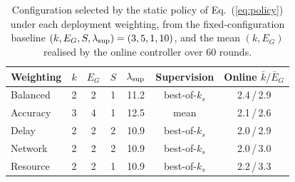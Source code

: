 \begin{table}[!t]\centering
\caption{Configuration selected by the static policy of Eq.~(\ref{eq:policy}) under each deployment weighting, from the fixed-configuration baseline $(k,E_G,S,\lambda_{\rm sup})=(3,5,1,10)$, and the mean $(k,E_G)$ realised by the online controller over 60 rounds.}
\label{tab:config}
\begin{tabular}{lcccccc}\toprule
Weighting & $k$ & $E_G$ & $S$ & $\lambda_{\rm sup}$ & Supervision & Online $\bar{k}/\bar{E}_G$ \\\midrule
Balanced & 2 & 2 & 1 & 11.2 & best-of-$k_s$ & 2.4\,/\,2.9 \\
Accuracy & 3 & 4 & 1 & 12.5 & mean & 2.1\,/\,2.6 \\
Delay & 2 & 2 & 2 & 10.9 & best-of-$k_s$ & 2.0\,/\,2.9 \\
Network & 2 & 2 & 2 & 10.9 & best-of-$k_s$ & 2.0\,/\,3.0 \\
Resource & 2 & 2 & 1 & 10.9 & best-of-$k_s$ & 2.2\,/\,3.3 \\
\bottomrule\end{tabular}\end{table}
